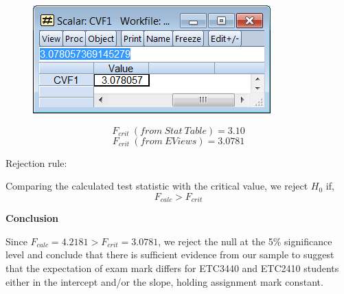 \documentclass[12pt]{report}
\begin{document}
\vspace{-\baselineskip}
\begin{figure}[H]
	\centering
	\includegraphics{q1_27}
\end{figure}
\vspace{-\baselineskip}
$$F_{crit}\ (from\ Stat\ Table) = 3.10$$
$$F_{crit}\ (from\ EViews) = 3.0781$$

\noindent Rejection rule: 

\noindent Comparing the calculated test statistic with the critical value, we reject $H_0$ if,
$$F_{calc} > F_{crit}$$

\noindent \textbf{Conclusion}

\noindent Since $F_{calc}=4.2181 > F_{crit}=3.0781$, we reject the null at the 5\% significance level and conclude that there is sufficient evidence from our sample to suggest that the expectation of exam mark differs for ETC3440 and ETC2410 students either in the intercept and/or the slope, holding assignment mark constant.
\end{document}
